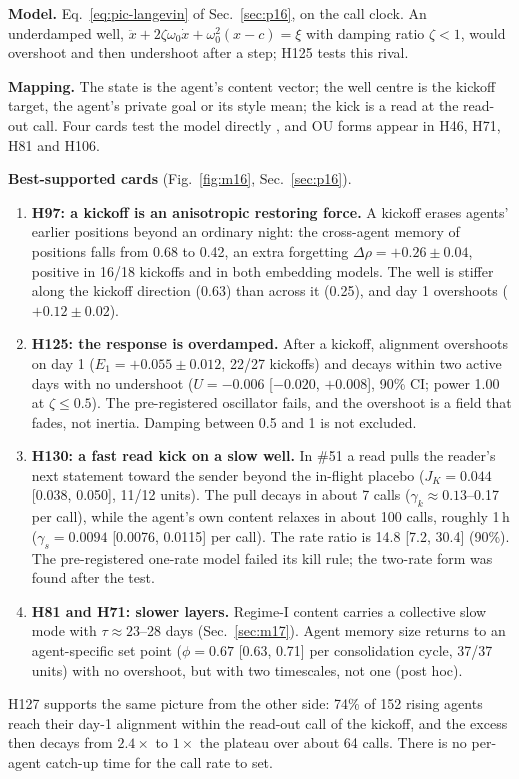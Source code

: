\textbf{Model.} Eq.~\eqref{eq:pic-langevin} of Sec.~\ref{sec:p16}, on the call clock. An underdamped well, $\ddot x+2\zeta\omega_0\dot x+\omega_0^2(x-c)=\xi$ with damping ratio $\zeta<1$, would overshoot and then undershoot after a step; H125 tests this rival.

\textbf{Mapping.} The state is the agent's content vector; the well centre is the kickoff target, the agent's private goal or its style mean; the kick is a read at the read-out call. Four cards test the model directly , and OU forms appear in H46, H71, H81 and H106.

\textbf{Best-supported cards} (Fig.~\ref{fig:m16}, Sec.~\ref{sec:p16}).
\begin{enumerate}
\item \textbf{H97: a kickoff is an anisotropic restoring force.} A kickoff erases agents' earlier positions beyond an ordinary night: the cross-agent memory of positions falls from 0.68 to 0.42, an extra forgetting $\Delta\rho=+0.26\pm0.04$, positive in 16/18 kickoffs and in both embedding models. The well is stiffer along the kickoff direction (0.63) than across it (0.25), and day 1 overshoots ($+0.12\pm0.02$).
\item \textbf{H125: the response is overdamped.} After a kickoff, alignment overshoots on day 1 ($E_1=+0.055\pm0.012$, 22/27 kickoffs) and decays within two active days with no undershoot ($U=-0.006$ [$-0.020$, $+0.008$], 90\% CI; power 1.00 at $\zeta\le0.5$). The pre-registered oscillator fails, and the overshoot is a field that fades, not inertia. Damping between 0.5 and 1 is not excluded.
\item \textbf{H130: a fast read kick on a slow well.} In \#51 a read pulls the reader's next statement toward the sender beyond the in-flight placebo ($J_K=0.044$ [0.038, 0.050], 11/12 units). The pull decays in about 7 calls ($\gamma_k\approx0.13$--0.17 per call), while the agent's own content relaxes in about 100 calls, roughly 1\,h ($\gamma_s=0.0094$ [0.0076, 0.0115] per call). The rate ratio is 14.8 [7.2, 30.4] (90\%). The pre-registered one-rate model failed its kill rule; the two-rate form was found after the test.
\item \textbf{H81 and H71: slower layers.} Regime-I content carries a collective slow mode with $\tau\approx23$--28 days (Sec.~\ref{sec:m17}). Agent memory size returns to an agent-specific set point ($\phi=0.67$ [0.63, 0.71] per consolidation cycle, 37/37 units) with no overshoot, but with two timescales, not one (post hoc).
\end{enumerate}
H127 supports the same picture from the other side: 74\% of 152 rising agents reach their day-1 alignment within the read-out call of the kickoff, and the excess then decays from $2.4\times$ to $1\times$ the plateau over about 64 calls. There is no per-agent catch-up time for the call rate to set.

